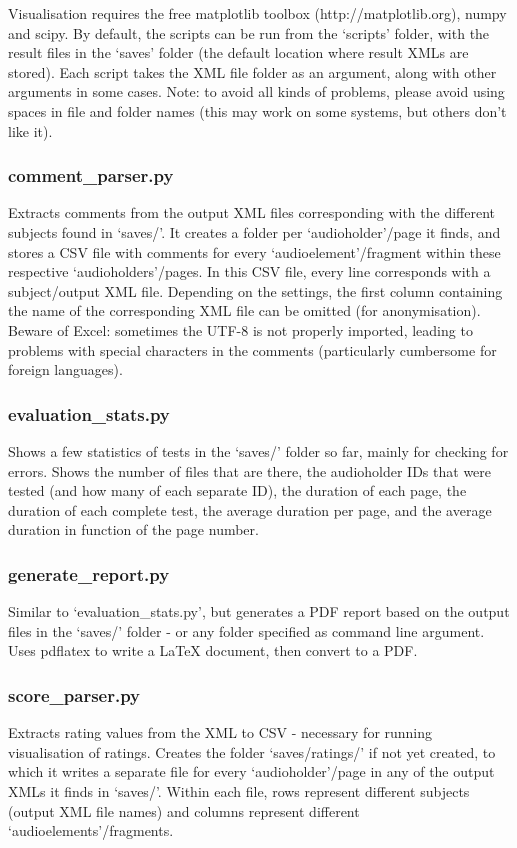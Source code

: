 \documentclass[11pt, oneside]{article}   	%
\begin{document}
		Visualisation requires the free matplotlib toolbox (http://matplotlib.org), numpy and scipy. 
		By default, the scripts can be run from the `scripts' folder, with the result files in the `saves' folder (the default location where result XMLs are stored). Each script takes the XML file folder as an argument, along with other arguments in some cases.
		Note: to avoid all kinds of problems, please avoid using spaces in file and folder names (this may work on some systems, but others don't like it). 

		\subsubsection{comment\_parser.py}
			Extracts comments from the output XML files corresponding with the different subjects found in `saves/'. It creates a folder per `audioholder'/page it finds, and stores a CSV file with comments for every `audioelement'/fragment within these respective `audioholders'/pages. In this CSV file, every line corresponds with a subject/output XML file. Depending on the settings, the first column containing the name of the corresponding XML file can be omitted (for anonymisation). 
			Beware of Excel: sometimes the UTF-8 is not properly imported, leading to problems with special characters in the comments (particularly cumbersome for foreign languages). 

		\subsubsection{evaluation\_stats.py}
			Shows a few statistics of tests in the `saves/' folder so far, mainly for checking for errors. Shows the number of files that are there, the audioholder IDs that were tested (and how many of each separate ID), the duration of each page, the duration of each complete test, the average duration per page, and the average duration in function of the page number. 

		\subsubsection{generate\_report.py}
			Similar to `evaluation\_stats.py', but generates a PDF report based on the output files in the `saves/' folder - or any folder specified as command line argument. Uses pdflatex to write a LaTeX document, then convert to a PDF. 

		\subsubsection{score\_parser.py}
			Extracts rating values from the XML to CSV - necessary for running visualisation of ratings. Creates the folder `saves/ratings/' if not yet created, to which it writes a separate file for every `audioholder'/page in any of the output XMLs it finds in `saves/'. Within each file, rows represent different subjects (output XML file names) and columns represent different `audioelements'/fragments. 
\end{document}
